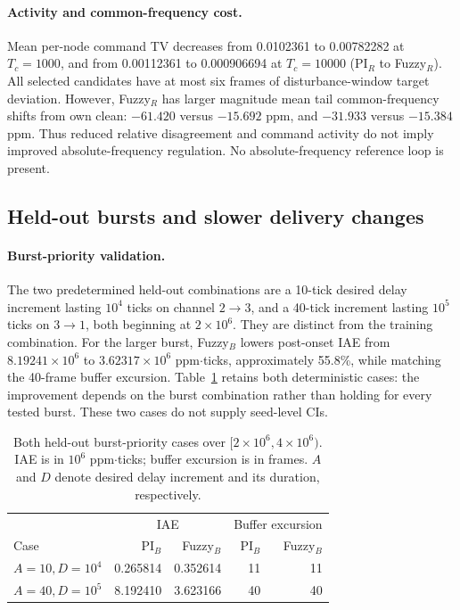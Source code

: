 \paragraph{Activity and common-frequency cost.}
Mean per-node command TV decreases from 0.0102361 to 0.00782282 at
$T_c=1000$, and from 0.00112361 to 0.000906694 at $T_c=10000$
(PI$_R$ to Fuzzy$_R$). All selected candidates have at most six frames
of disturbance-window target deviation. However, Fuzzy$_R$ has larger
magnitude mean tail common-frequency shifts from own clean:
$-61.420$ versus $-15.692$ ppm, and $-31.933$ versus $-15.384$ ppm.
Thus reduced relative disagreement and command activity do not
imply improved absolute-frequency regulation. No absolute-frequency
reference loop is present.

\subsection{Held-out bursts and slower delivery changes}
\label{detail:subsec:eval_burst}

\paragraph{Burst-priority validation.}
The two predetermined held-out combinations are a 10-tick desired
delay increment lasting $10^4$ ticks on channel $2\to3$, and a
40-tick increment lasting $10^5$ ticks on $3\to1$, both beginning
at $2\times10^6$. They are distinct from the training combination.
For the larger burst, Fuzzy$_B$ lowers post-onset IAE from
$8.19241\times10^6$ to $3.62317\times10^6$ ppm$\cdot$ticks,
approximately 55.8\%, while matching the 40-frame buffer excursion.
Table~\ref{detail:tab:eval_heldout_bursts} retains both deterministic cases:
the improvement depends on the burst combination rather than holding
for every tested burst. These two cases do not supply seed-level CIs.

\begin{table}[t]
\caption{Both held-out burst-priority cases over
$[2\times10^6,4\times10^6)$. IAE is in $10^6$ ppm$\cdot$ticks;
buffer excursion is in frames. $A$ and $D$ denote desired delay
increment and its duration, respectively.}
\label{detail:tab:eval_heldout_bursts}
\centering
\begin{tabular}{@{}lrrrr@{}}\toprule
 & \multicolumn{2}{c}{IAE} & \multicolumn{2}{c}{Buffer excursion}\\
Case & PI$_B$ & Fuzzy$_B$ & PI$_B$ & Fuzzy$_B$\\\midrule
$A=10,D=10^4$ & 0.265814 & 0.352614 & 11 & 11\\
$A=40,D=10^5$ & 8.192410 & 3.623166 & 40 & 40\\\bottomrule
\end{tabular}
\end{table}

